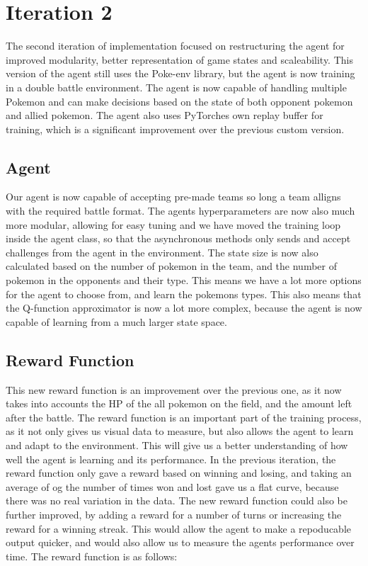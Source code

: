 \section{Iteration 2}
\label{sec:Iteration-2-Agent-Environment}
The second iteration of implementation focused on restructuring the agent for improved 
modularity, better representation of game states and scaleability. This version of the agent still
uses the Poke-env library, but the agent is now training in a double battle environment. The
agent is now capable of handling multiple Pokemon and can make decisions based on the state of 
both opponent pokemon and allied pokemon. The agent also uses PyTorches own replay buffer for
training, which is a significant improvement over the previous custom version.

\subsection{Agent}
Our agent is now capable of accepting pre-made teams so long a team alligns with the required battle
format. The agents hyperparameters are now also much more modular, allowing for easy tuning and
we have moved the training loop inside the agent class, so that the asynchronous methods only
sends and accept challenges from the agent in the environment. The state size is now also 
calculated based on the number of pokemon in the team, and the number of pokemon in the opponents 
and their type. This means we have a lot more options for the agent to choose from, and learn 
the pokemons types. This also means that the Q-function approximator is now a lot more complex,
because the agent is now capable of learning from a much larger state space. 


\subsection{Reward Function}
This new reward function is an improvement over the previous one, as it now takes into accounts
the HP of the all pokemon on the field, and the amount left after the battle. The reward function
is an important part of the training process, as it not only gives us visual data to measure, but
also allows the agent to learn and adapt to the environment. This will give us a better understanding
of how well the agent is learning and its performance. In the previous iteration, the reward
function only gave a reward based on winning and losing, and taking an average of og the number of
times won and lost gave us a flat curve, because there was no real variation in the data.
The new reward function could also be further improved, by adding a reward for a number of turns
or increasing the reward for a winning streak. This would allow the agent to make a repoducable output
quicker, and would also allow us to measure the agents performance over time.
The reward function is as follows:


